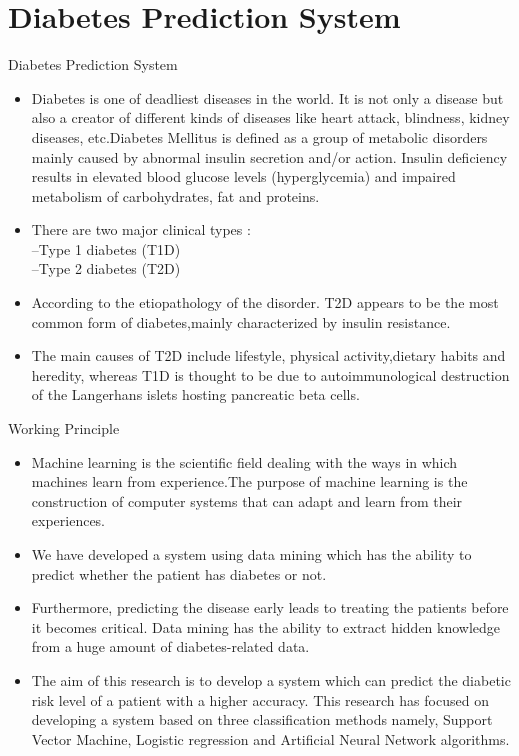 \documentclass{SKP-beamer}
\begin{document}
\section{\textbf{Diabetes Prediction System}}

\begin{frame}{Diabetes Prediction System}
	\begin{itemize}
		\item Diabetes is one of deadliest diseases in the
		world. It is not only a disease but also a creator of
		different kinds of diseases like heart attack,
		blindness, kidney diseases, etc.Diabetes Mellitus is defined as a group of metabolic
		disorders mainly caused by abnormal insulin
		secretion and/or action. Insulin deficiency results in
		elevated blood glucose levels (hyperglycemia) and
		impaired metabolism of carbohydrates, fat and
		proteins.
		\item There are two major clinical types : \\ 
		--Type 1 diabetes (T1D) \\
		--Type 2 diabetes (T2D) 
		\item According to the etiopathology
		of the disorder. T2D appears to be the most common
		form of diabetes,mainly characterized by insulin resistance. 
		\item The main causes of T2D include lifestyle, physical activity,dietary habits and heredity, whereas T1D is thought to be due to autoimmunological destruction of the Langerhans islets hosting pancreatic beta cells.	
	\end{itemize}
\end{frame}

\begin{frame}{Working Principle}
	\begin{itemize}
		\item Machine learning is the scientific field
		dealing with the ways in which machines learn from
		experience.The purpose of
		machine learning is the construction of computer
		systems that can adapt and learn from their experiences.
		\item We have developed a system using data
		mining which has the ability to predict whether the
		patient has diabetes or not.
		\item Furthermore, predicting
		the disease early leads to treating the patients before
		it becomes critical. Data mining has the ability to
		extract hidden knowledge from a huge amount of
		diabetes-related data.
		\item The aim of this research is to develop a system
		which can predict the diabetic risk level of a patient
		with a higher accuracy. This research has focused on
		developing a system based on three classification
		methods namely, Support Vector Machine, Logistic
		regression and Artificial Neural Network algorithms. 
	\end{itemize}
\end{frame}
\end{document}
